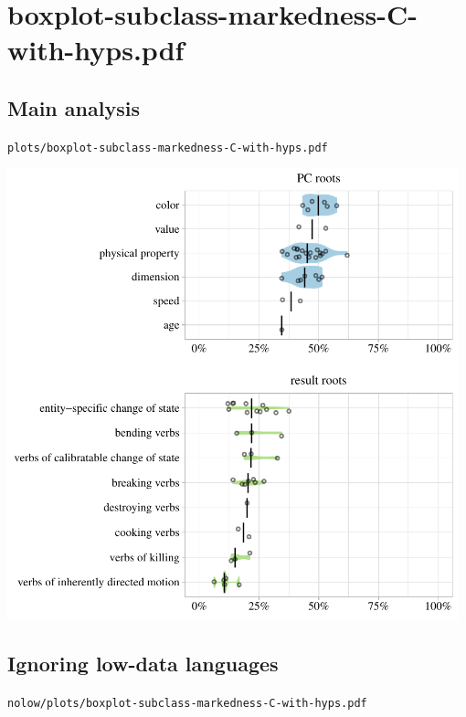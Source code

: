 \eject

\section{boxplot-subclass-markedness-C-with-hyps.pdf}

\subsection{Main analysis}

\texttt{plots/boxplot-subclass-markedness-C-with-hyps.pdf}

\includegraphics[width=0.98\textwidth]{../plots/boxplot-subclass-markedness-C-with-hyps.pdf}

\subsection{Ignoring low-data languages}

\texttt{nolow/plots/boxplot-subclass-markedness-C-with-hyps.pdf}

